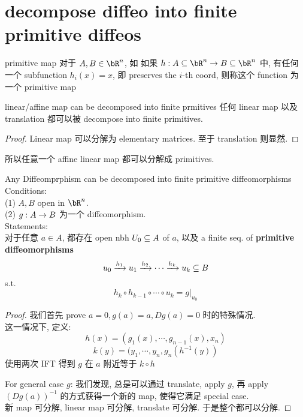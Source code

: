 \documentclass[lang=cn,11pt]{elegantbook}
\begin{document}
\section{decompose diffeo into finite primitive diffeos}

\begin{definition}{primitive map}
对于 $A, B \in \bR^n$, 如
    如果 $h:A \sub\bR^n \rar B \sub\bR^n$ 中, 有任何一个 subfunction $h_i(x) = x$, 即 preserves the $i$-th coord, 则称这个 function 为一个 primitive map
\end{definition}


\begin{lemma}{linear/affine map can be decomposed into finite prmitives}
任何 linear map 以及 translation 都可以被 decompose into finite primitives.
\end{lemma}
\begin{proof}
    Linear map 可以分解为 elementary matrices.
    至于 translation 则显然.
\end{proof}
\begin{remark}
    所以任意一个 affine linear map 都可以分解成 primitives.
\end{remark}


\begin{theorem}{Any Diffeomprphism can be decomposed into finite primitive diffeomorphisms}
Conditions:\\
(1) $A, B$ open in $\bR^n$.\\
(2) $g:A \rightarrow B$ 为一个 diffeomorphism.\\
Statements:\\
对于任意 $a \in A$, 都存在 open nbh $U_0 \subseteq A$ of $a$, 以及 a finite seq. of \textbf{primitive diffeomorphisms}
$$
u_0 \xrightarrow{h_1} u_1 \xrightarrow{h_2} \cdots \xrightarrow{h_k} u_k \subseteq B
$$
s.t. 
$$
h_k \circ h_{k-1} \circ \cdots \circ u_k  = g |_{u_0}
$$
\end{theorem}
\begin{proof}
    我们首先 prove $a = 0, g(a) = a, Dg(a) = 0$ 时的特殊情况.\\
    这一情况下, 定义:
    $$
    h (x) = (g_1(x), \cdots, g_{n-1}(x), x_n)
    $$
    $$
    k(y) = (y_1, \cdots, y_n, g_n(h^{-1}(y))
    $$
    使用两次 IFT 得到 $g$ 在 $a$ 附近等于 $k \circ h$

    For general case $g$: 我们发现, 总是可以通过 translate, apply $g$, 再 apply $ (Dg(a))^{-1}$ 的方式获得一个新的 map, 使得它满足 special case.\\
    新 map 可分解, linear map 可分解, translate 可分解. 于是整个都可以分解.
\end{proof}
\end{document}
